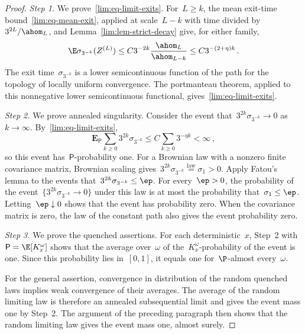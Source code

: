 \documentclass[11pt]{amsart}
\begin{document}
\begin{proof}
\emph{Step 1.} We prove~\eqref{lim:eq-limit-exits}. For~$L\geq k$, the mean exit-time bound~\eqref{lim:eq-mean-exit}, applied at scale~$L-k$ with time divided by~$3^{2L}/\ahom_L$, and Lemma~\ref{lim:lem-strict-decay} give, for either family,
\begin{equation*}
	\E\sigma_{3^{-k}}(Z^{(L)})
	\leq C3^{-2k}\frac{\ahom_L}{\ahom_{L-k}}
	\leq C3^{-(2+\eta)k}\,.
\end{equation*}
The exit time~$\sigma_{3^{-k}}$ is a lower semicontinuous function of the path for the topology of locally uniform convergence. The portmanteau theorem, applied to this nonnegative lower semicontinuous functional, gives~\eqref{lim:eq-limit-exits}.

\smallskip

\emph{Step 2.} We prove annealed singularity. Consider the event that~$3^{2k}\sigma_{3^{-k}}\to0$ as~$k\to\infty$. By~\eqref{lim:eq-limit-exits},
\begin{equation*}
	\mathbf E_{\mathsf P}\sum_{k\geq0}3^{2k}\sigma_{3^{-k}}
	\leq C\sum_{k\geq0}3^{-\eta k}<\infty\,,
\end{equation*}
so this event has~$\mathsf P$-probability one. For a Brownian law with a nonzero finite covariance matrix, Brownian scaling gives~$3^{2k}\sigma_{3^{-k}}\overset{\mathrm{law}}=\sigma_1>0$. Apply Fatou's lemma to the events that~$3^{2k}\sigma_{3^{-k}}\leq\ep$. For every~$\ep>0$, the probability of the event~$\{3^{2k}\sigma_{3^{-k}}\to0\}$ under this law is at most the probability that~$\sigma_1\leq\ep$. Letting~$\ep\downarrow0$ shows that the event has probability zero. When the covariance matrix is zero, the law of the constant path also gives the event probability zero.

\smallskip

\emph{Step 3.} We prove the quenched assertions. For each deterministic~$x$, Step~2 with~$\mathsf P=\E[K_x^\omega]$ shows that the average over~$\omega$ of the~$K_x^\omega$-probability of the event is one. Since this probability lies in~$[0,1]$, it equals one for~$\P$-almost every~$\omega$.

\smallskip

For the general assertion, convergence in distribution of the random quenched laws implies weak convergence of their averages. The average of the random limiting law is therefore an annealed subsequential limit and gives the event mass one by Step~2. The argument of the preceding paragraph then shows that the random limiting law gives the event mass one, almost surely.
\end{proof}
\end{document}
